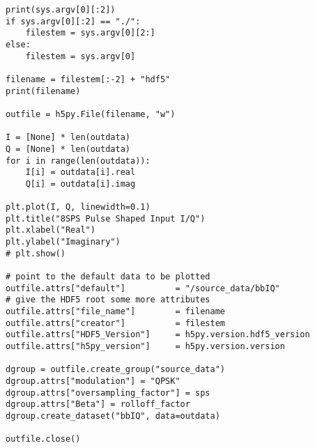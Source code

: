 \begin{lstlisting}[breaklines]
print(sys.argv[0][:2])
if sys.argv[0][:2] == "./":
	filestem = sys.argv[0][2:]
else:
	filestem = sys.argv[0]

filename = filestem[:-2] + "hdf5"
print(filename)

outfile = h5py.File(filename, "w")

I = [None] * len(outdata)
Q = [None] * len(outdata)
for i in range(len(outdata)):
	I[i] = outdata[i].real
	Q[i] = outdata[i].imag

plt.plot(I, Q, linewidth=0.1)
plt.title("8SPS Pulse Shaped Input I/Q")
plt.xlabel("Real")
plt.ylabel("Imaginary")
# plt.show()

# point to the default data to be plotted
outfile.attrs["default"]          = "/source_data/bbIQ"
# give the HDF5 root some more attributes
outfile.attrs["file_name"]        = filename
outfile.attrs["creator"]          = filestem
outfile.attrs["HDF5_Version"]     = h5py.version.hdf5_version
outfile.attrs["h5py_version"]     = h5py.version.version

dgroup = outfile.create_group("source_data")
dgroup.attrs["modulation"] = "QPSK"
dgroup.attrs["oversampling_factor"] = sps
dgroup.attrs["Beta"] = rolloff_factor
dgroup.create_dataset("bbIQ", data=outdata)

outfile.close()
\end{lstlisting}

